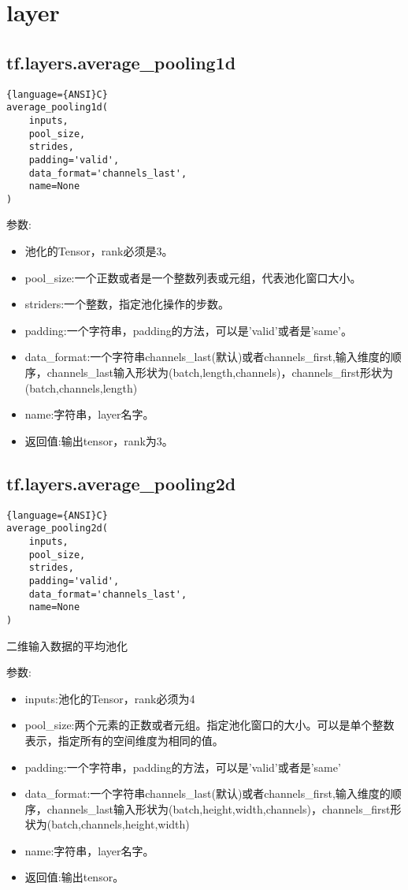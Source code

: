\section{layer}
\subsection{tf.layers.average\_pooling1d}
\begin{lstlisting}{language={ANSI}C}
average_pooling1d(
    inputs,
    pool_size,
    strides,
    padding='valid',
    data_format='channels_last',
    name=None
)
\end{lstlisting}
参数:
\begin{itemize}
	\item 池化的Tensor，rank必须是3。
	\item pool\_size:一个正数或者是一个整数列表或元组，代表池化窗口大小。
	\item striders:一个整数，指定池化操作的步数。
	\item padding:一个字符串，padding的方法，可以是'valid'或者是'same'。
	\item data\_format:一个字符串channels\_last(默认)或者channels\_first,输入维度的顺序，channels\_last输入形状为(batch,length,channels)，channels\_first形状为(batch,channels,length)
	\item name:字符串，layer名字。
	\item 返回值:输出tensor，rank为3。
\end{itemize}
\subsection{tf.layers.average\_pooling2d}
\begin{lstlisting}{language={ANSI}C}
average_pooling2d(
    inputs,
    pool_size,
    strides,
    padding='valid',
    data_format='channels_last',
    name=None
)
\end{lstlisting}
二维输入数据的平均池化

参数:
\begin{itemize}
	\item inputs:池化的Tensor，rank必须为4
	\item pool\_size:两个元素的正数或者元组。指定池化窗口的大小。可以是单个整数表示，指定所有的空间维度为相同的值。
	\item padding:一个字符串，padding的方法，可以是'valid'或者是'same'
	\item data\_format:一个字符串channels\_last(默认)或者channels\_first,输入维度的顺序，channels\_last输入形状为(batch,height,width,channels)，channels\_first形状为(batch,channels,height,width)
	\item name:字符串，layer名字。
	\item 返回值:输出tensor。
\end{itemize}
